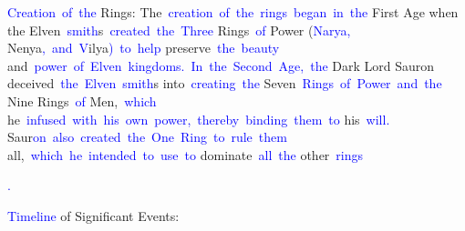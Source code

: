 \documentclass{article}
\begin{document}
\begin{tcolorbox}[colframe=black,colback=white]
{}\textcolor{blue}{Creation}\textcolor{blue}{~of}\textcolor{blue}{~the} Rings: 
The\textcolor{blue}{~creation}\textcolor{blue}{~of}\textcolor{blue}{~the}\textcolor{blue}{~rings}\textcolor{blue}{~began}\textcolor{blue}{~in}\textcolor{blue}{~the} First Age when the Elven\textcolor{blue}{~smith}s\textcolor{blue}{~created}\textcolor{blue}{~the}\textcolor{blue}{~Three} Rings\textcolor{blue}{~of} Power (\textcolor{blue}{N}\textcolor{blue}{arya}\textcolor{blue}{,} Nenya\textcolor{blue}{,}\textcolor{blue}{~and}\textcolor{blue}{~V}ilya\textcolor{blue}{)}\textcolor{blue}{~to}\textcolor{blue}{~help} preserve\textcolor{blue}{~the}\textcolor{blue}{~beauty} and\textcolor{blue}{~power}\textcolor{blue}{~of}\textcolor{blue}{~El}\textcolor{blue}{ven}\textcolor{blue}{~kingdoms}\textcolor{blue}{.}\textcolor{blue}{~In}\textcolor{blue}{~the}\textcolor{blue}{~Second}\textcolor{blue}{~Age}\textcolor{blue}{,}\textcolor{blue}{~the} Dark Lord Sauron deceived\textcolor{blue}{~the}\textcolor{blue}{~El}\textcolor{blue}{ven}\textcolor{blue}{~smith}s into\textcolor{blue}{~creating}\textcolor{blue}{~the} Seven\textcolor{blue}{~Rings}\textcolor{blue}{~of}\textcolor{blue}{~Power}\textcolor{blue}{~and}\textcolor{blue}{~the} Nine Rings\textcolor{blue}{~of} Men,\textcolor{blue}{~which} he\textcolor{blue}{~infused}\textcolor{blue}{~with}\textcolor{blue}{~his}\textcolor{blue}{~own}\textcolor{blue}{~power}\textcolor{blue}{,}\textcolor{blue}{~thereby}\textcolor{blue}{~binding}\textcolor{blue}{~them}\textcolor{blue}{~to} his\textcolor{blue}{~will}\textcolor{blue}{.} Saur\textcolor{blue}{on}\textcolor{blue}{~also}\textcolor{blue}{~created}\textcolor{blue}{~the}\textcolor{blue}{~One}\textcolor{blue}{~Ring}\textcolor{blue}{~to}\textcolor{blue}{~rule}\textcolor{blue}{~them} all,\textcolor{blue}{~which}\textcolor{blue}{~he}\textcolor{blue}{~intended}\textcolor{blue}{~to}\textcolor{blue}{~use}\textcolor{blue}{~to} dominate\textcolor{blue}{~all}\textcolor{blue}{~the} other\textcolor{blue}{~rings}\textcolor{blue}{.

}\textcolor{blue}{Timeline} of Significant Events: 


\end{tcolorbox}
\end{document}
